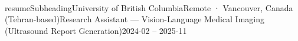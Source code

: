 \\resumeSubheading{University of British Columbia}{Remote · Vancouver, Canada (Tehran-based)}{Research Assistant — Vision-Language Medical Imaging (Ultrasound Report Generation)}{2024-02 -- 2025-11}
